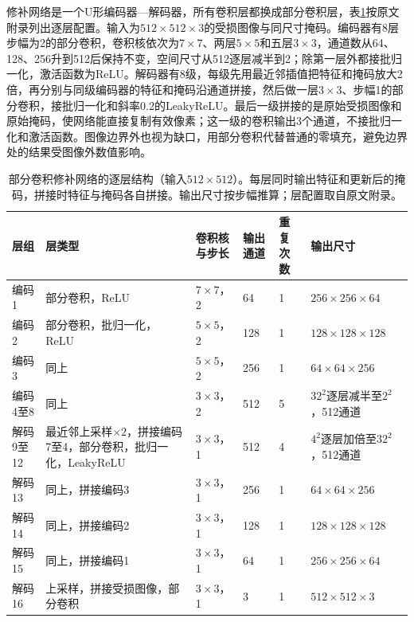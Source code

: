 修补网络是一个U形编码器—解码器，所有卷积层都换成部分卷积层，表\ref{tab:vision-pconv-layers}按原文附录列出逐层配置。输入为$512\times512\times3$的受损图像与同尺寸掩码。编码器有8层步幅为2的部分卷积，卷积核依次为$7\times7$、两层$5\times5$和五层$3\times3$，通道数从64、128、256升到512后保持不变，空间尺寸从512逐层减半到2；除第一层外都接批归一化，激活函数为ReLU。解码器有8级，每级先用最近邻插值把特征和掩码放大2倍，再分别与同级编码器的特征和掩码沿通道拼接，然后做一层$3\times3$、步幅1的部分卷积，接批归一化和斜率0.2的LeakyReLU。最后一级拼接的是原始受损图像和原始掩码，使网络能直接复制有效像素；这一级的卷积输出3个通道，不接批归一化和激活函数。图像边界外也视为缺口，用部分卷积代替普通的零填充，避免边界处的结果受图像外数值影响。

\begin{table}[tbp]
 \centering
 \small
 \begin{tabularx}{\linewidth}{@{}p{26mm}Xp{20mm}p{12mm}p{12mm}p{26mm}@{}}
  \toprule
  层组 & 层类型 & 卷积核与步长 & 输出通道 & 重复次数 & 输出尺寸\\
  \midrule
  编码1 & 部分卷积，ReLU & $7\times7$，2 & 64 & 1 & $256\times256\times64$\\
  编码2 & 部分卷积，批归一化，ReLU & $5\times5$，2 & 128 & 1 & $128\times128\times128$\\
  编码3 & 同上 & $5\times5$，2 & 256 & 1 & $64\times64\times256$\\
  编码4至8 & 同上 & $3\times3$，2 & 512 & 5 & $32^2$逐层减半至$2^2$，512通道\\
  解码9至12 & 最近邻上采样$\times2$，拼接编码7至4，部分卷积，批归一化，LeakyReLU & $3\times3$，1 & 512 & 4 & $4^2$逐层加倍至$32^2$，512通道\\
  解码13 & 同上，拼接编码3 & $3\times3$，1 & 256 & 1 & $64\times64\times256$\\
  解码14 & 同上，拼接编码2 & $3\times3$，1 & 128 & 1 & $128\times128\times128$\\
  解码15 & 同上，拼接编码1 & $3\times3$，1 & 64 & 1 & $256\times256\times64$\\
  解码16 & 上采样，拼接受损图像，部分卷积 & $3\times3$，1 & 3 & 1 & $512\times512\times3$\\
  \bottomrule
 \end{tabularx}
 \caption{部分卷积修补网络的逐层结构（输入$512\times512$）。每层同时输出特征和更新后的掩码，拼接时特征与掩码各自拼接。输出尺寸按步幅推算；层配置取自原文附录。}
 \label{tab:vision-pconv-layers}
\end{table}

